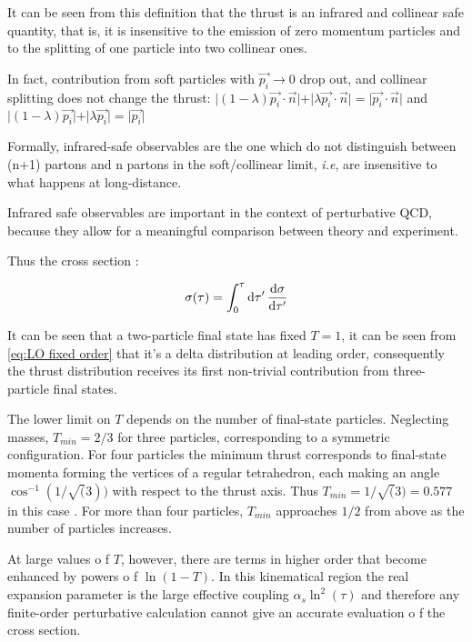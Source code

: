 \documentclass[../main.tex]{subfiles}
\begin{document}
It can be seen from this definition that the thrust is an infrared and collinear safe
quantity, that is, it is insensitive to the emission of zero momentum particles and to the splitting of 
one particle into two collinear ones.

In fact, contribution from soft particles with $\vec{p_i}\to 0$ drop out, and collinear splitting does not change the thrust:
$\vert (1-\lambda)\vec{p_i}\cdot \vec{n} \vert + \vert \lambda \vec{p_i}\cdot \vec{n}\vert = \vert \vec{p_i}\cdot \vec{n} \vert$ and 
$\vert (1-\lambda)\vec{p_i} \vert + \vert \lambda \vec{p_i}\vert = \vert \vec{p_i} \vert$

Formally, infrared-safe observables are the one which do not distinguish between (n+1) partons and n partons in the soft/collinear limit, \emph{i.e},
are insensitive to what happens at long-distance.

Infrared safe observables are important in the context of perturbative QCD, because they allow for a meaningful comparison between theory and experiment. 

Thus the cross section :

\begin{equation}\label{eq:cross_section}
    \sigma(\tau) = \int^\tau_0 \dd{\tau'} \dv{\sigma}{\tau'}
\end{equation}

It can be seen that a two-particle final state has fixed $T = 1$, it can be seen from \cref{eq:LO fixed order} that it's 
a delta distribution at leading order, consequently the thrust
distribution receives its first non-trivial contribution from three-particle final states.

The lower limit on $T$ depends on the number of final-state particles.
Neglecting masses, $T_{min} = 2/3$ for three particles, corresponding to a symmetric
configuration. For four particles the minimum thrust corresponds to final-state
momenta forming the vertices of a regular tetrahedron, each making an angle
$\cos^{-1}(1/\sqrt(3))$ with respect to the thrust axis. Thus $T_{min} = 1/\sqrt(3) = 0.577$ in this
case . For more than four particles, $T_{min}$ approaches $1/2$ from above as the number of particles increases.

At large values o f $T$, however, there are terms in higher order that become enhanced by powers o f $\ln(1 - T)$.
In this kinematical region the real expansion parameter is the
large effective coupling $\alpha_s \ln^2(\tau)$ and therefore
any finite-order perturbative calculation cannot give an accurate evaluation o f the cross section.
\end{document}
